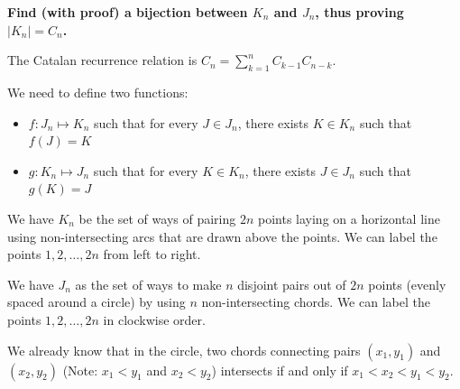 \documentclass[10pt]{article}
\begin{document}
\begin{enumerate}
\begin{enumerate}
\begin{center}
\quad\quad
{}

\end{center}
\textbf{Find (with proof) a bijection between $K_n$ and $J_n$, thus proving $|K_n| = C_n$.}

The Catalan recurrence relation is $C_n= \sum\limits^{n}_{k=1}C_{k-1}C_{n-k}$.

We need to define two functions: 
\begin{itemize}
    \item $f:J_n \mapsto K_n$ such that for every $J \in J_n$, there exists $K \in K_n$ such that $f(J) =K$
    \item $g:K_n \mapsto J_n$ such that for every $K \in K_n$, there exists $J \in J_n$ such that $g(K) =J$
\end{itemize}

We have $K_n$ be the set of ways of pairing $2n$ points laying on a horizontal line using non-intersecting arcs that are drawn above the points. We can label the points $1,2, \ldots,2n$ from left to right. 

We have $J_n$ as the set of ways to make $n$ disjoint pairs out of $2n$ points (evenly spaced around a circle) by using $n$ non-intersecting chords. We can label the points $1,2, \ldots,2n$ in clockwise order. 

We already know that in the circle, two chords connecting pairs $(x_1, y_1)$ and $(x_2, y_2)$  (Note: $x_1 < y_1$ and  $x_2 < y_2$) intersects if and only if $x_1 < x_2 < y_1 < y_2$.


\end{enumerate}
\end{enumerate}
\end{document}
